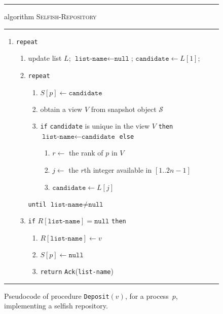 \documentclass[11pt]{article}
\newcommand{\FF}{\vspace*{\medskipamount}}
\newcommand{\cS}{\mathcal{S}}
\begin{document}
\begin{figure}[t]
\hrule

\FF

\textsf{algorithm} \textsc{Selfish-Repository}

\FF

\hrule

\FF

\begin{enumerate}[nosep]

\item
\texttt{repeat}

\begin{enumerate}[nosep]
\item
\label{sel-dep-update}
update list $L$; 
$\texttt{list-name}\leftarrow \texttt{null}$;
$\texttt{candidate}\leftarrow L[1]$; 
\item
\texttt{repeat}
\begin{enumerate}[nosep]
\item
$S[p]\leftarrow \texttt{candidate}$
\item
obtain a view $V$ from snapshot object $\cS$
\item
\texttt{if} \texttt{candidate} is unique in the view $V$ \texttt{then} $\texttt{list-name}\leftarrow \texttt{candidate}$ \texttt{else} 
\begin{enumerate}[nosep]
\item
$r\leftarrow$ the rank of $p$ in $V$ 
\item
$j\leftarrow$  the $r$th integer available in $[1..2n-1]$
\item
$\texttt{candidate}\leftarrow L[j]$
\end{enumerate}
\end{enumerate}
\texttt{until} $\texttt{list-name} \ne \texttt{null}$
\label{sel-dep-verify-null}
\item
\texttt{if} $R[\texttt{list-name}]=\texttt{null}$  \texttt{then}
\begin{enumerate}[nosep]
\item 
\label{sel-dep-store}
$R[\texttt{list-name}]\leftarrow v$
\item 
$S[p]\leftarrow\texttt{null}$

\item 
\label{sel-dep:ack}
\texttt{return} \texttt{Ack}(\texttt{list-name})
\end{enumerate}
\end{enumerate}
\end{enumerate}
\FF

\hrule

\FF

\caption{\label{fig:alg-selfish-deposit}
Pseudocode of procedure \texttt{Deposit}$(v)$, for a process~$p$, implementing a selfish repository.}
\end{figure}
\end{document}
